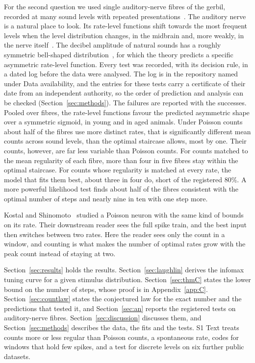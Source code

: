 For the second question we used single auditory-nerve fibres of the gerbil, recorded at many sound levels with repeated
presentations~\cite{Heeringa2024}. The auditory nerve is a natural place to look. Its rate-level functions shift towards the most
frequent levels when the level distribution changes, in the midbrain and, more weakly, in the nerve itself~\cite{Wen2009}. The
decibel amplitude of natural sounds has a roughly symmetric bell-shaped distribution~\cite{Escabi2003}, for which the theory predicts a
specific asymmetric rate-level function. Every test was recorded, with its decision rule, in a dated log before the data were analysed.
The log is in the repository named under Data availability, and the entries for these tests carry a certificate of their date
from an independent authority, so the order of prediction and analysis can be checked (Section~\ref{sec:methods}). The failures are
reported with the successes. Pooled over fibres, the rate-level functions favour the predicted asymmetric shape over a symmetric sigmoid, in young and in aged animals.
Under Poisson counts about half of the fibres use more distinct rates, that is significantly different mean counts across sound
levels, than the optimal staircase allows, most by one. Their counts, however, are far less variable than
Poisson counts. For counts matched to the mean regularity of each fibre, more than four in five fibres stay within the optimal
staircase. For counts whose regularity is matched at every rate, the model that fits them best, about three in four do, short of the
registered $80\%$. A more powerful likelihood test finds about half of the fibres consistent with the optimal number of steps and nearly nine in ten
with one step more.

Kostal and Shinomoto~\cite{KostalShinomoto2016} studied a Poisson neuron with the same kind of bounds on its rate. Their downstream
reader sees the full spike train, and the best input then switches between two rates. Here the reader sees only the count in a
window, and counting is what makes the number of optimal rates grow with the peak count instead of staying at two.

Section~\ref{sec:results} holds the results. Section~\ref{sec:laughlin} derives the infomax tuning curve for a given stimulus
distribution. Section~\ref{sec:thmC} states the lower bound on the number of steps, whose proof is in Appendix~\ref{app:C}.
Section~\ref{sec:countlaw} states the conjectured law for the exact number and the predictions that tested it, and Section~\ref{sec:an}
reports the registered tests on auditory-nerve fibres. Section~\ref{sec:discussion} discusses them, and Section~\ref{sec:methods}
describes the data, the fits and the tests. S1 Text treats counts more or less regular than Poisson counts, a
spontaneous rate, codes for windows that hold few spikes, and a test for discrete levels on six further public datasets.
